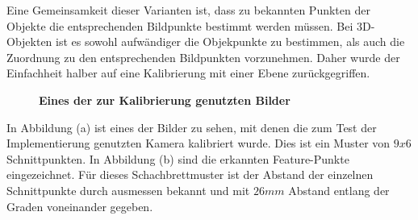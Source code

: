 Eine Gemeinsamkeit dieser Varianten ist, dass zu bekannten Punkten der Objekte die entsprechenden Bildpunkte bestimmt werden müssen.
Bei 3D-Objekten ist es sowohl aufwändiger die Objekpunkte zu bestimmen, als auch die Zuordnung zu den entsprechenden Bildpunkten vorzunehmen. Daher wurde der Einfachheit halber auf eine Kalibrierung mit einer Ebene zurückgegriffen. 
\begin{figure}
\qquad
{}
\caption{\textbf{Eines der zur Kalibrierung genutzten Bilder}}
\label{Fig:calibplane}

\end{figure}
In Abbildung  (a) ist eines der Bilder zu sehen, mit denen die zum Test der Implementierung genutzten Kamera kalibriert wurde. Dies ist ein Muster von $9x6$ Schnittpunkten. In Abbildung   (b) sind die erkannten Feature-Punkte eingezeichnet. Für dieses Schachbrettmuster ist der Abstand der einzelnen Schnittpunkte durch ausmessen bekannt und mit $26mm$ Abstand entlang der Graden voneinander gegeben. 

